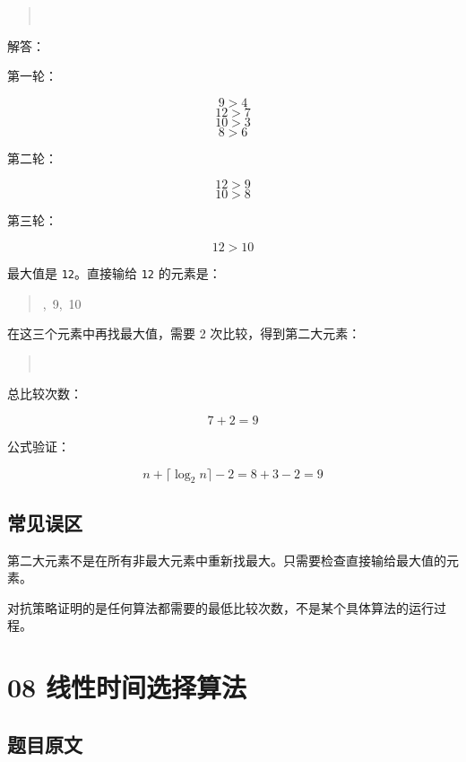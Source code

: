 \documentclass[UTF8,zihao=-4]{ctexart}
\begin{document}
\begin{quote}
\small\ttfamily\raggedright
\relax [9,\ 4,\ 7,\ 12,\ 3,\ 10,\ 6,\ 8]\\
\end{quote}

解答：

第一轮：

\[9 > 4\]
\[12 > 7\]
\[10 > 3\]
\[8 > 6\]

第二轮：

\[12 > 9\]
\[10 > 8\]

第三轮：

\[12 > 10\]

最大值是 \texttt{12}。直接输给 \texttt{12} 的元素是：

\begin{quote}
\small\ttfamily\raggedright
{},\ 9,\ 10\\
\end{quote}

在这三个元素中再找最大值，需要 2 次比较，得到第二大元素：

\begin{quote}
\small\ttfamily\raggedright
{}\\
\end{quote}

总比较次数：

\[7 + 2 = 9\]

公式验证：

\[n + \lceil \log_2 n \rceil - 2 = 8 + 3 - 2 = 9\]

\subsection*{常见误区}

第二大元素不是在所有非最大元素中重新找最大。只需要检查直接输给最大值的元素。

对抗策略证明的是任何算法都需要的最低比较次数，不是某个具体算法的运行过程。

\newpage

\section*{08 线性时间选择算法}

\subsection*{题目原文}
\end{document}
